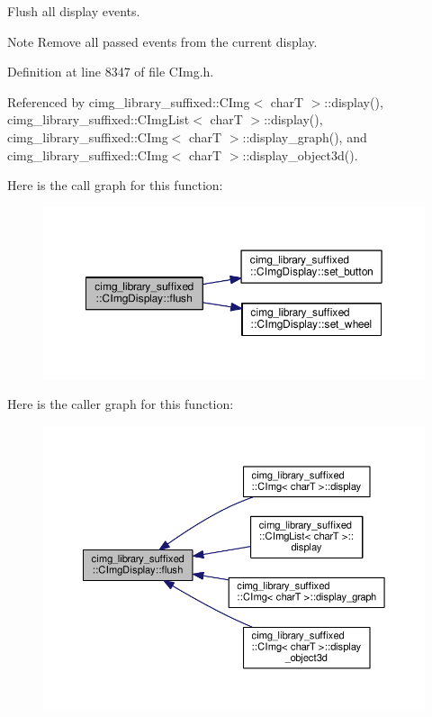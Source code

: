 Flush all display events. 

\begin{DoxyNote}{Note}
Remove all passed events from the current display. 
\end{DoxyNote}


Definition at line 8347 of file C\+Img.\+h.



Referenced by cimg\+\_\+library\+\_\+suffixed\+::\+C\+Img$<$ char\+T $>$\+::display(), cimg\+\_\+library\+\_\+suffixed\+::\+C\+Img\+List$<$ char\+T $>$\+::display(), cimg\+\_\+library\+\_\+suffixed\+::\+C\+Img$<$ char\+T $>$\+::display\+\_\+graph(), and cimg\+\_\+library\+\_\+suffixed\+::\+C\+Img$<$ char\+T $>$\+::display\+\_\+object3d().

Here is the call graph for this function\+:
\nopagebreak
\begin{figure}[H]
\begin{center}
\leavevmode
\includegraphics[width=350pt]{d5/d53/structcimg__library__suffixed_1_1CImgDisplay_a260b55ecbe9f4648a045357f8906f3c7_cgraph}
\end{center}
\end{figure}
Here is the caller graph for this function\+:
\nopagebreak
\begin{figure}[H]
\begin{center}
\leavevmode
\includegraphics[width=350pt]{d5/d53/structcimg__library__suffixed_1_1CImgDisplay_a260b55ecbe9f4648a045357f8906f3c7_icgraph}
\end{center}
\end{figure}
